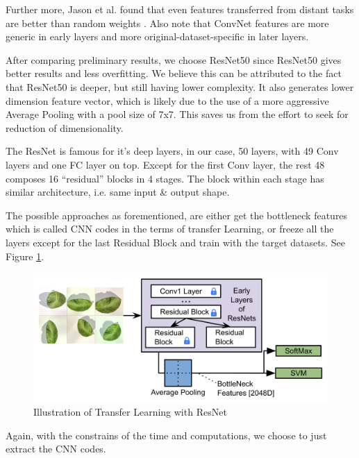 \documentclass[journal, 10pt]{IEEEtran}
\begin{document}
  Further more, Jason et al. found that even features transferred from distant tasks are better than random weights \cite{Jason2014}. Also note that ConvNet features are more generic in early layers and more original-dataset-specific in later layers\cite{CS231N}.

  After comparing preliminary results, we choose ResNet50 since ResNet50 gives better results and less overfitting. We believe this can be attributed to the fact that ResNet50 is deeper, but still having lower complexity\cite{ResNet}. It also generates lower dimension feature vector, which is likely due to the use of a more aggressive Average Pooling with a pool size of 7x7. This saves us from the effort to seek for reduction of dimensionality.


  The ResNet is famous for it's deep layers\cite{ResNet}, in our case, 50 layers, with 49 Conv layers and one FC layer on top. Except for the first Conv layer, the rest 48 composes 16 ``residual'' blocks in 4 stages. The block within each stage has similar architecture, i.e. same input \& output shape. \par

  The possible approaches as forementioned, are either get the bottleneck features which is called CNN codes in the terms of transfer Learning, or freeze all the layers except for the last Residual Block and train with the target datasets. See Figure \ref{fig:tl_resnet}.

  \begin{figure}[H]
    \centering
    \includegraphics[scale=0.23]{TL_ResNet}
    \caption{ Illustration of Transfer Learning with ResNet }
    \label{fig:tl_resnet}
  \end{figure}
  Again, with the constrains of the time and computations, we choose to just extract the CNN codes.
\end{document}
